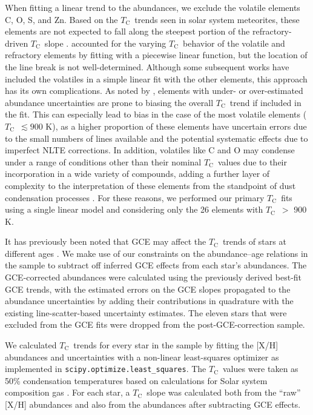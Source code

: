 \documentclass[twocolumn, trackchanges]{aastex62}
\newcommand{\tc}{$T_\mathrm{C}$}
\newcommand{\acronym}[1]{{\small{#1}}}
\begin{document}
When fitting a linear trend to the abundances, we exclude the volatile elements C, O, S, and Zn. Based on the \tc\ trends seen in solar system meteorites, these elements are not expected to fall along the steepest portion of the refractory-driven \tc\ slope \citep[][and references therein]{chambers10}. \citet{melendez09} accounted for the varying \tc\ behavior of the volatile and refractory elements by fitting with a piecewise linear function, but the location of the line break is not well-determined. Although some subsequent works have included the volatiles in a simple linear fit with the other elements, this approach has its own complications. As noted by \citet{adibekyan16}, elements with under- or over-estimated abundance uncertainties are prone to biasing the overall \tc\ trend if included in the fit. This can especially lead to bias in the case of the most volatile elements (\tc\ $\lesssim 900$ K), as a higher proportion of these elements have uncertain errors due to the small numbers of lines available and the potential systematic effects due to imperfect \acronym{NLTE} corrections. 
In addition, volatiles like C and O may condense under a range of conditions other than their nominal \tc\ values due to their incorporation in a wide variety of compounds, adding a further layer of complexity to the interpretation of these elements from the standpoint of dust condensation processes \citep{lodders03}. For these reasons, we performed our primary \tc\ fits using a single linear model and considering only the 26 elements with \tc\ $>$ 900 K.

It has previously been noted that \acronym{GCE} may affect the \tc\ trends of stars at different ages \citep{adibekyan14}. We make use of our constraints on the abundance--age relations in the sample to subtract off inferred \acronym{GCE} effects from each star's abundances. The \acronym{GCE}-corrected abundances were calculated using the previously derived best-fit \acronym{GCE} trends, with the estimated errors on the \acronym{GCE} slopes propagated to the abundance uncertainties by adding their contributions in quadrature with the existing line-scatter-based uncertainty estimates. The eleven stars that were excluded from the \acronym{GCE} fits were dropped from the post-\acronym{GCE}-correction sample.

We calculated \tc\ trends for every star in the sample by fitting the [X/H] abundances and uncertainties with a non-linear least-squares optimizer as implemented in \texttt{scipy.optimize.least\_squares}. The \tc\ values were taken as 50\% condensation temperatures based on calculations for Solar system composition gas \citep{lodders03}. For each star, a \tc\ slope was calculated both from the ``raw'' [X/H] abundances and also from the abundances after subtracting \acronym{GCE} effects. 
\end{document}

